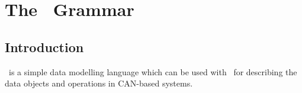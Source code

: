 \chapter{The \sdml\ Grammar} \label{chap:datparse}


\section{Introduction}
\sdml\ is a simple data modelling language which can be used with
\candle\ for describing the data objects and operations in CAN-based systems. 

